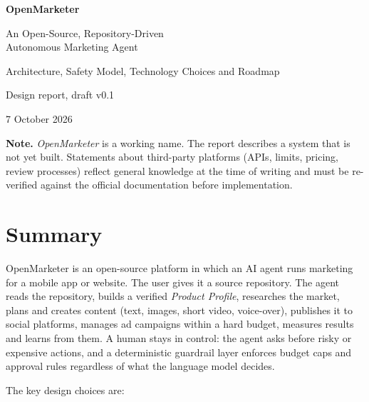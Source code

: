 \documentclass[11pt,a4paper]{article}
\begin{document}
\begin{titlepage}
\centering
\vspace*{3.2cm}
{\Huge\bfseries OpenMarketer\par}
\vspace{0.6cm}
{\LARGE An Open-Source, Repository-Driven\\Autonomous Marketing Agent\par}
\vspace{0.9cm}
{\large Architecture, Safety Model, Technology Choices and Roadmap\par}
\vspace{2.2cm}
{\large Design report, draft v0.1\par}
\vspace{0.3cm}
{\large 7 October 2026\par}
\vspace{3.5cm}
\begin{minipage}{0.82\textwidth}
\small\textbf{Note.} \emph{OpenMarketer} is a working name. The report describes a system that is not yet built. Statements about third-party platforms (APIs, limits, pricing, review processes) reflect general knowledge at the time of writing and must be re-verified against the official documentation before implementation.
\end{minipage}
\end{titlepage}

\tableofcontents
\clearpage

\section*{Summary}

OpenMarketer is an open-source platform in which an AI agent runs marketing for a mobile app or website. The user gives it a source repository. The agent reads the repository, builds a verified \emph{Product Profile}, researches the market, plans and creates content (text, images, short video, voice-over), publishes it to social platforms, manages ad campaigns within a hard budget, measures results and learns from them. A human stays in control: the agent asks before risky or expensive actions, and a deterministic guardrail layer enforces budget caps and approval rules regardless of what the language model decides.

The key design choices are:
\end{document}

